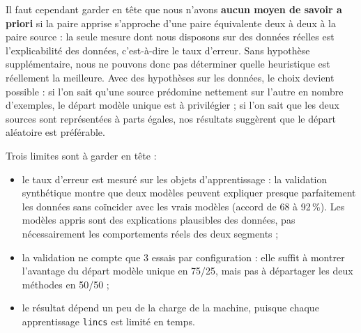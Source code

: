 \documentclass[11pt,a4paper]{article}
\begin{document}
Il faut cependant garder en tête que nous n'avons \textbf{aucun moyen de savoir a priori} si la paire apprise
s'approche d'une paire équivalente deux à deux à la paire source : la seule mesure dont nous disposons sur des
données réelles est l'explicabilité des données, c'est-à-dire le taux d'erreur. Sans hypothèse supplémentaire,
nous ne pouvons donc pas déterminer quelle heuristique est réellement la meilleure. Avec des hypothèses sur les
données, le choix devient possible : si l'on sait qu'une source prédomine nettement sur l'autre en nombre
d'exemples, le départ modèle unique est à privilégier ; si l'on sait que les deux sources sont représentées à
parts égales, nos résultats suggèrent que le départ aléatoire est préférable.

Trois limites sont à garder en tête :
\begin{itemize}
  \item le taux d'erreur est mesuré sur les objets d'apprentissage : la validation synthétique montre que deux
        modèles peuvent expliquer presque parfaitement les données sans coïncider avec les vrais modèles (accord
        de 68 à 92\,\%). Les modèles appris sont des explications plausibles des données, pas nécessairement
        les comportements réels des deux segments ;
  \item la validation ne compte que 3 essais par configuration : elle suffit à montrer l'avantage du départ
        modèle unique en 75/25, mais pas à départager les deux méthodes en 50/50 ;
  \item le résultat dépend un peu de la charge de la machine, puisque chaque apprentissage \texttt{lincs} est
        limité en temps.
\end{itemize}
\end{document}
